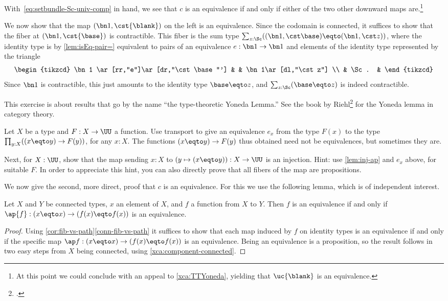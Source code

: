 With~\eqref{eq:setbundle-Sc-univ-comp} in hand, we see that $c$ is an equivalence
if and only if either of the two other downward maps are.\footnote{%
  At this point we could conclude with an appeal to \cref{xca:TTYoneda},
  yielding that $\uc{\blank}$ is an equivalence.}
  

We now show that the map $(\bn 1,\cst{\blank})$
on the left is an equivalence. Since the codomain is connected,
it suffices to show that the fiber at $(\bn 1,\cst{\base})$ is contractible.
This fiber is the sum type $\sum_{z:\Sc}((\bn 1,\cst \base)\eqto(\bn 1,\cst z))$,
where the identity type is by \cref{lem:isEq-pair=} equivalent to pairs of
an equivalence $e : \bn 1 \to \bn 1$ and elements of the identity type
represented by the triangle
\[
  \begin{tikzcd}
    \bn 1 \ar[rr,"e"]\ar[dr,"\cst \base"'] & & \bn 1\ar[dl,"\cst z"] \\
    & \Sc. &
  \end{tikzcd}
\]
Since $\bn 1$ is contractible, this just amounts to the identity type
$\base\eqto z$, and $\sum_{z:\Sc}(\base\eqto z)$ is indeed contractible.

\begin{xca}\label{xca:TTYoneda}
This exercise is about results that go by the name ``the type-theoretic
Yoneda Lemma.'' See the book by Riehl\footcite{RiehlContext}
for the Yoneda lemma in category theory.

Let $X$ be a type and $F: X\to\UU$ a function. Use transport
to give an equivalence $e_x$ from the type $F(x)$ to the type
$\prod_{y:X} ((x\eqto y) \to F(y))$, for any $x:X$.
The functions $(x\eqto y) \to F(y)$
thus obtained need not be equivalences, but sometimes they are.

Next, for $X:\UU$, show that the map sending
$x:X$ to $(y \mapsto (x\eqto y)) : X\to\UU$ is an injection.
Hint: use \cref{lem:inj-ap} and $e_x$ above, for suitable $F$. In order
to appreciate this hint, you can also directly prove that all fibers
of the map are propositions.
\end{xca}

We now give the second, more direct, proof that $c$ is an equivalence.
For this we use the following lemma, which is of independent interest.
\begin{lemma}\label{lem:conn-eq-f-ap-f-x}
Let $X$ and $Y$ be connected types, $x$ an element of $X$,
and $f$ a function from $X$ to $Y$. Then $f$ is an equivalence
if and only if $\ap{f}: (x\eqto x) \to (f(x)\eqto f(x))$ is an equivalence.
\end{lemma}
\begin{proof}
Using \cref{cor:fib-vs-path}\ref{conn-fib-vs-path} it suffices to show that
each map induced by $f$ on identity types is an equivalence if and only if the specific map
$\ap f : (x\eqto x) \to (f(x) \eqto f(x))$ is an equivalence.
Being an equivalence is a proposition,
so the result follows in two easy steps from $X$ being connected,
using \cref{xca:component-connected}.
\end{proof}

